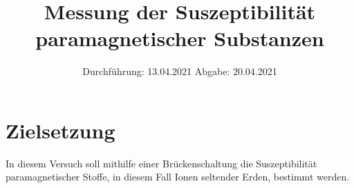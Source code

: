 

\subject{V606}
\title{Messung der Suszeptibilität paramagnetischer Substanzen}
\date{
    Durchführung: 13.04.2021
     \hspace{3em}
    Abgabe: 20.04.2021
}


\maketitle
\thispagestyle{empty}
\tableofcontents
\newpage

\section{Zielsetzung}

    In diesem Versuch soll mithilfe einer Brückenschaltung die Suszeptibilität paramagnetischer Stoffe, 
    in diesem Fall Ionen seltender Erden,
    bestimmt werden.


\clearpage


\clearpage


\clearpage


\clearpage






